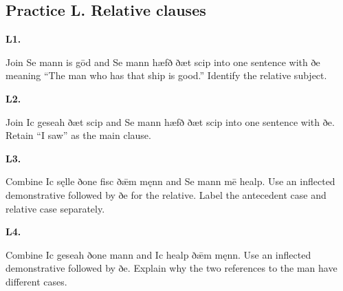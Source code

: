 \subsection*{Practice L. Relative clauses}

\par\begin{minipage}{\linewidth}\raggedright
\textbf{L1.}

Join Se mann is gōd and Se mann hæfð ðæt scip into one sentence with ðe meaning “The man who has that ship is good.” Identify the relative subject.

\end{minipage}\par\addvspace{4pt}

\par\begin{minipage}{\linewidth}\raggedright
\textbf{L2.}

Join Ic geseah ðæt scip and Se mann hæfð ðæt scip into one sentence with ðe. Retain “I saw” as the main clause.

\end{minipage}\par\addvspace{4pt}

\par\begin{minipage}{\linewidth}\raggedright
\textbf{L3.}

Combine Ic sęlle ðone fisc ðǣm męnn and Se mann mē healp. Use an inflected demonstrative followed by ðe for the relative. Label the antecedent case and relative case separately.

\end{minipage}\par\addvspace{4pt}

\par\begin{minipage}{\linewidth}\raggedright
\textbf{L4.}

Combine Ic geseah ðone mann and Ic healp ðǣm męnn. Use an inflected demonstrative followed by ðe. Explain why the two references to the man have different cases.

\end{minipage}\par\addvspace{4pt}

